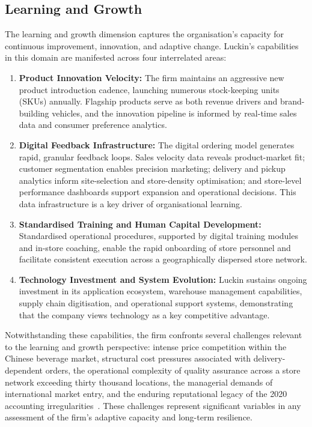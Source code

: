 \documentclass[12pt,a4paper]{article}
\begin{document}
\subsection{Learning and Growth}

The learning and growth dimension captures the organisation's capacity for continuous improvement, innovation, and adaptive change. Luckin's capabilities in this domain are manifested across four interrelated areas:

\begin{enumerate}[leftmargin=*,label=(\alph*)]
  \item \textbf{Product Innovation Velocity:} The firm maintains an aggressive new product introduction cadence, launching numerous stock-keeping units (SKUs) annually. Flagship products serve as both revenue drivers and brand-building vehicles, and the innovation pipeline is informed by real-time sales data and consumer preference analytics.
  \item \textbf{Digital Feedback Infrastructure:} The digital ordering model generates rapid, granular feedback loops. Sales velocity data reveals product-market fit; customer segmentation enables precision marketing; delivery and pickup analytics inform site-selection and store-density optimisation; and store-level performance dashboards support expansion and operational decisions. This data infrastructure is a key driver of organisational learning.
  \item \textbf{Standardised Training and Human Capital Development:} Standardised operational procedures, supported by digital training modules and in-store coaching, enable the rapid onboarding of store personnel and facilitate consistent execution across a geographically dispersed store network.
  \item \textbf{Technology Investment and System Evolution:} Luckin sustains ongoing investment in its application ecosystem, warehouse management capabilities, supply chain digitisation, and operational support systems, demonstrating that the company views technology as a key competitive advantage.
\end{enumerate}

Notwithstanding these capabilities, the firm confronts several challenges relevant to the learning and growth perspective: intense price competition within the Chinese beverage market, structural cost pressures associated with delivery-dependent orders, the operational complexity of quality assurance across a store network exceeding thirty thousand locations, the managerial demands of international market entry, and the enduring reputational legacy of the 2020 accounting irregularities~\cite{luckin2025annual}. These challenges represent significant variables in any assessment of the firm's adaptive capacity and long-term resilience.
\end{document}
